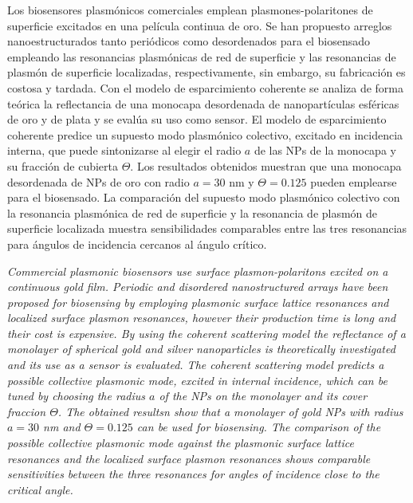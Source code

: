 

\begin{abstracts}        %


Los biosensores plasmónicos comerciales emplean plasmones-polaritones de superficie excitados en una película continua de oro. Se han propuesto arreglos nanoestructurados tanto periódicos como desordenados para el biosensado empleando las resonancias plasmónicas de red de superficie  y  las resonancias de plasmón de superficie localizadas,  respectivamente, sin embargo, su fabricación es costosa y tardada. Con el modelo de esparcimiento coherente se analiza de forma teórica la reflectancia de una monocapa desordenada de nanopartículas esféricas de oro y de plata y se evalúa su uso como sensor. El modelo de esparcimiento coherente predice un supuesto modo plasmónico colectivo, excitado en incidencia interna, que puede sintonizarse al elegir el radio $a$ de las NPs de la monocapa y su fracción de cubierta $\Theta$. Los resultados obtenidos muestran que una monocapa desordenada de NPs de oro con radio $a=30$ nm y $\Theta=0.125$ pueden emplearse para el biosensado. La comparación del supuesto modo plasmónico colectivo con la resonancia plasmónica de red de superficie y la resonancia de plasmón de superficie localizada muestra sensibilidades comparables entre las tres resonancias para ángulos de incidencia cercanos al ángulo crítico. 

\vspace*{1cm}\textit{
Commercial plasmonic biosensors use surface plasmon-polaritons excited on a continuous gold film. Periodic and disordered nanostructured arrays have been proposed for biosensing by employing plasmonic surface lattice resonances and localized surface plasmon resonances, however their production time is long and their cost is expensive.  By using the coherent scattering model the reflectance of a  monolayer of spherical gold and silver nanoparticles  is theoretically investigated and its use as a sensor is evaluated. The coherent scattering model predicts a possible collective plasmonic mode, excited in internal incidence, which can be tuned by choosing the radius $a$ of the NPs on the monolayer and its cover fraccion $\Theta$. The obtained resultsn show that a monolayer of gold NPs with radius $ a = 30 $ nm and $ \Theta = 0.125 $  can be used for biosensing. The comparison of the possible collective plasmonic mode against the plasmonic surface lattice resonances and the localized surface plasmon resonances shows comparable sensitivities between the three resonances for angles of incidence close to the critical angle.}



\end{abstracts}


